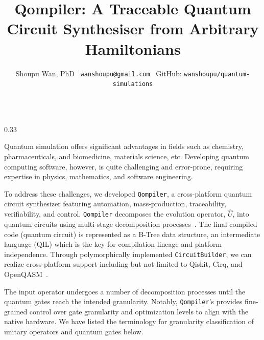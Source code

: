 \documentclass[final]{beamer}
\title{Qompiler: A Traceable Quantum Circuit Synthesiser from Arbitrary Hamiltonians}
\author{Shoupu Wan, PhD \ \texttt{wanshoupu@gmail.com} \ GitHub: \texttt{wanshoupu/quantum-simulations}}
\institute{Open For Quantum Computing Jobs}
\let\oldblock\block
\let\endoldblock\endblock
\renewenvironment{block}[1]{
    \vspace{2em} %
    \oldblock{#1}
    }{
    \endoldblock   %
}
\begin{document}
    \begin{frame}[t]
        \begin{columns}[t]

            \begin{column}{0.33\textwidth}

                \begin{block}{Introduction}
                    Quantum simulation offers significant advantages in fields such as chemistry, pharmaceuticals, and biomedicine, materials science, etc.
                    Developing quantum computing software, however, is quite challenging and error-prone,
                    requiring expertise in physics, mathematics, and software engineering.


                    To address these challenges, we developed \texttt{Qompiler}, a cross-platform quantum circuit synthesizer
                    featuring automation, mass-production, traceability, verifiability, and control.
                    \texttt{Qompiler} decomposes the evolution operator, $\hat{U}$, into quantum circuits
                    using multi-stage decomposition processes~\cite{nielsen2010quantum}.
                    The final compiled code (quantum circuit) is represented as a B-Tree data structure,
                    an intermediate language (QIL) which is the key for compilation lineage and platform independence.
                    Through polymorphically implemented \texttt{CircuitBuilder}, we can realize cross-platform support including but not limited to
                    Qiskit, Cirq, and OpenQASM~\cite{cirq2024,qiskit2023,openqasm2,openqasm3}.
                \end{block}


                \begin{block}{Methodology}
                    The input operator undergoes a number of decomposition processes
                    until the quantum gates reach the intended granularity.
                    Notably, \texttt{Qompiler}'s provides fine-grained control over gate granularity and optimization levels
                    to align with the native hardware.
                    We have listed the terminology for granularity classification of unitary operators and quantum gates below.



\end{block}
\end{column}
\end{columns}
\end{frame}
\end{document}
